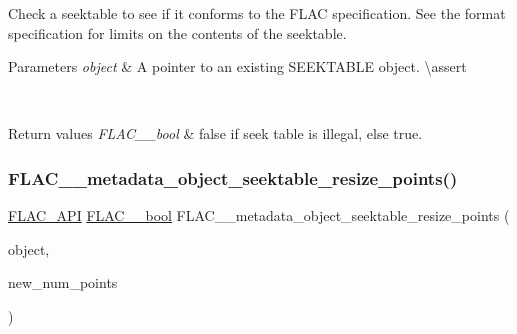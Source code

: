 Check a seektable to see if it conforms to the F\+L\+AC specification. See the format specification for limits on the contents of the seektable.


\begin{DoxyParams}{Parameters}
{\em object} & A pointer to an existing S\+E\+E\+K\+T\+A\+B\+LE object. \textbackslash{}assert 
\begin{DoxyCode}{1}
\end{DoxyCode}
 
\begin{DoxyCode}{1}
\end{DoxyCode}
 \\
\hline
\end{DoxyParams}

\begin{DoxyRetVals}{Return values}
{\em F\+L\+A\+C\+\_\+\+\_\+bool} & {\ttfamily false} if seek table is illegal, else {\ttfamily true}. \\
\hline
\end{DoxyRetVals}
\mbox{\label{group__flac__metadata__object_ga836f94fa622ece4f50dadf27c7ec107a}} 
\subsubsection{\texorpdfstring{FLAC\_\_metadata\_object\_seektable\_resize\_points()}{FLAC\_\_metadata\_object\_seektable\_resize\_points()}}
{\footnotesize\ttfamily \mbox{\hyperlink{group__flac__export_ga56ca07df8a23310707732b1c0007d6f5}{F\+L\+A\+C\+\_\+\+A\+PI}} \mbox{\hyperlink{ordinals_8h_a95103469f1cbd78b8cf250194985b34e}{F\+L\+A\+C\+\_\+\+\_\+bool}} F\+L\+A\+C\+\_\+\+\_\+metadata\+\_\+object\+\_\+seektable\+\_\+resize\+\_\+points (\begin{DoxyParamCaption}\item[{\mbox{\hyperlink{struct_f_l_a_c_____stream_metadata}{F\+L\+A\+C\+\_\+\+\_\+\+Stream\+Metadata}} $\ast$}]{object,  }\item[{unsigned}]{new\+\_\+num\+\_\+points }\end{DoxyParamCaption})}


